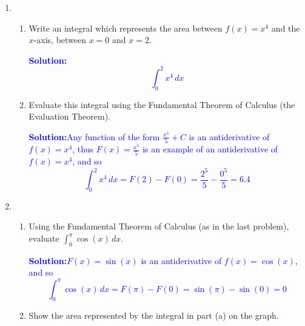 \documentclass[letterpaper,11pt]{article}
\def\ds{\displaystyle}
\newcommand{\sol}[2]{\begin{minipage}[c][#1]{\linewidth}{\textcolor{blue}{\textbf{Solution:}}\quad \textcolor{blue}{#2}}\end{minipage}}
\newcommand{\sol}[2]{\begin{minipage}[c][#1]{\linewidth}{\vfill}\end{minipage}}
\begin{document}
\begin{enumerate}
\begin{enumerate}
\begin{enumerate}
\item The Fundamental Theorem of Calculus (the Evaluation Theorem) tells us that $\ds \int_a^b f(t)\, dt=F(b)-F(a)$. Use this theorem and the function you found in the last step to find the temperature of the soda after 3 hours have passed. 

\sol{3 in}{
Evaluating the integral gives us:
\[\int_0^3 f(t)\,dt=12.5e^{-6}-12.5=F(3)-F(0)\]
Substituting the evaluated integral and the given initial temperature $F(0)=60$, we have:
\[12.5e^{-6}-12.5=F(3)-60\]
Solving for F(3)
\[F(3)\approx 47.531^\circ F\]
}
\end{enumerate}

\item Why do you think your estimate in part (a) is so far off?

\sol{.5in}{$f(t)$ changes very quickly between 0 and 3. We should have used a smaller $\Delta t$  }

\end{enumerate}


\newpage
\item 
\begin{enumerate}
\item Write an integral which represents the area between $f(x) = x^4$ and the $x$-axis, between $x=0$ and $x=2$.

\sol{.7 in}{\[\int_0^2 x^4\,dx\]}

\item Evaluate this integral using the Fundamental Theorem of Calculus (the Evaluation Theorem).

\sol{1.3 in}{Any function of the form $\ds \frac{x^5}{5}+C$ is an antiderivative of $f(x)=x^4$, thus $\ds F(x)=\frac{x^5}{5}$ is an example of an antiderivative of $f(x)=x^4$, and so
\[\int_0^2 x^4\,dx=F(2)-F(0)=\frac{2^5}{5}-\frac{0^5}{5}=6.4\]
}

\end{enumerate}
\item  
\begin{enumerate}
\item Using the Fundamental Theorem of Calculus (as in the last problem), evaluate $\ds \int_0^\pi \cos(x)\,dx$.

\sol{1.2 in}{$F(x)=\sin(x)$ is an antiderivative of $f(x)=\cos(x)$, and so
\[\int_0^\pi \cos(x)\,dx=F(\pi)-F(0)=\sin(\pi)-\sin(0)=0\]
}

\item Show the area represented by the integral in part (a) on the graph.


\end{enumerate}
\end{enumerate}
\end{document}
